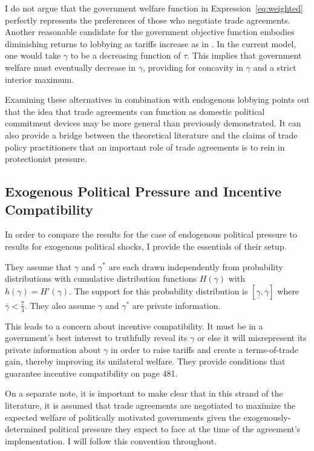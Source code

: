 \documentclass[12pt]{article}
\newcommand{\ov}{\overline}
\newcommand{\un}{\underline}
\newcommand{\ga}{\gamma}
\begin{document}

I do not argue that the government welfare function in Expression~\ref{eq:weighted} perfectly represents the preferences of those who negotiate trade agreements. Another reasonable candidate for the government objective function embodies diminishing returns to lobbying as tariffs increase as in \Textcite{ethier2012}. In the current model, one would take $\ga$ to be a decreasing function of $\tau$. This implies that government welfare must eventually decrease in $\ga$, providing for concavity in $\ga$ and a strict interior maximum.

Examining these alternatives in combination with endogenous lobbying points out that the idea that trade agreements can function as domestic political commitment devices may be more general than previously demonstrated. It can also provide a bridge between the theoretical literature and the claims of trade policy practitioners that an important role of trade agreements is to rein in protectionist pressure.

\subsection{Exogenous Political Pressure and Incentive Compatibility}
In order to compare the results for the case of endogenous political pressure to \Textcite{bs2005} results for exogenous political shocks, I provide the essentials of their setup. 

They assume that $\ga$ and $\ga^*$ are each drawn independently from probability distributions with cumulative distribution functions $H(\ga)$ with $h(\ga)=H'(\ga)$. The support for this probability distribution is $\left[\un{\ga}, \ov{\ga} \right]$ where $\ov{\ga} < \frac{7}{4}$. They also assume $\ga$ and $\ga^*$ are private information.

This leads to a concern about incentive compatibility. It must be in a government's best interest to truthfully reveal its $\ga$ or else it will misrepresent its private information about $\ga$ in order to raise tariffs and create a terms-of-trade gain, thereby improving its unilateral welfare. They provide conditions that guarantee incentive compatibility on page 481.

On a separate note, it is important to make clear that in this strand of the literature, it is assumed that trade agreements are negotiated to maximize the expected welfare of politically motivated governments given the exogenously-determined political pressure they expect to face at the time of the agreement's implementation. I will follow this convention throughout.
\end{document}
